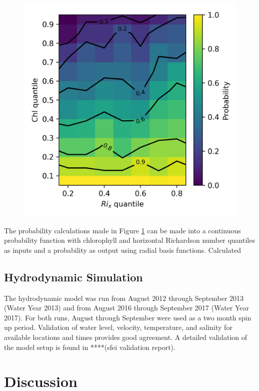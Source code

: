 \documentclass[preprint,review,12pt]{elsarticle}
\begin{document}
\begin{figure}[ht!]
\centering
\includegraphics[width=\textwidth]{Figures/chl_rix_pdf.png}
\caption{}
\label{fig:chl_pdf}
\end{figure}
\FloatBarrier

The probability calculations made in Figure \ref{fig:chl_pdf} can be made into a continuous probability function with chlorophyll and horizontal Richardson number quantiles as inputs and a probability as output using radial basis functions. Calculated 

\subsection{Hydrodynamic Simulation}
The hydrodynamic model was run from August 2012 through September 2013 (Water Year 2013) and from August 2016 through September 2017 (Water Year 2017). For both runs, August through September were used as a two month spin up period. Validation of water level, velocity, temperature, and salinity for available locations and times provides good agreement. A detailed validation of the model setup is found in ****(sfei validation report). 



\section{Discussion}\label{S:discussion}
\end{document}
